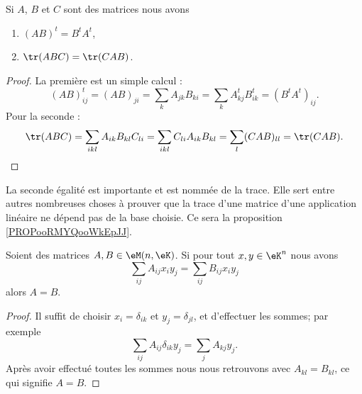 \begin{lemma}        \label{LEMooUXDRooWZbMVN}
    Si \( A\), \( B\) et \( C\) sont des matrices nous avons
    \begin{enumerate}
        \item
            \( (AB)^t=B^tA^t\),
        \item       \label{ITEMooXDYQooAlnArd}
            \( \tr(ABC)=\tr(CAB)\).
    \end{enumerate}
\end{lemma}

\begin{proof}
    La première est un simple calcul :
    \begin{equation}
        (AB)^t_{ij}=(AB)_{ji}=\sum_kA_{jk}B_{ki}=\sum_kA^t_{kj}B^t_{ik}=(B^tA^t)_{ij}.
    \end{equation}
    Pour la seconde :
    \begin{equation}
        \tr(ABC)=\sum_{ikl}A_{ik}B_{kl}C_{li}=\sum_{ikl}C_{li}A_{ik}B_{kl}=\sum_l(CAB)_{ll}=\tr(CAB).
    \end{equation}
\end{proof}

\begin{normaltext}
    La seconde égalité est importante et est nommée  de la trace. Elle sert entre autres nombreuses choses à prouver que la trace d'une matrice d'une application linéaire ne dépend pas de la base choisie. Ce sera la proposition \ref{PROPooRMYQooWkEpJJ}.
\end{normaltext}

\begin{lemma}       \label{LEMooLXAHooPRyHaF}
    Soient des matrices \( A,B\in \eM(n,\eK)\). Si pour tout \( x,y\in \eK^n\) nous avons
    \begin{equation}
        \sum_{ij}A_{ij}x_iy_j=\sum_{ij}B_{ij}x_iy_j
    \end{equation}
    alors \( A=B\).
\end{lemma}

\begin{proof}
    Il suffit de choisir \( x_i=\delta_{ik}\) et \( y_j=\delta_{jl}\), et d'effectuer les sommes; par exemple
    \begin{equation}
        \sum_{ij}A_{ij}\delta_{ik}y_j=\sum_jA_{kj}y_j.
    \end{equation}
    Après avoir effectué toutes les sommes nous nous retrouvons avec \( A_{kl}=B_{kl}\), ce qui signifie \( A=B\).
\end{proof}


